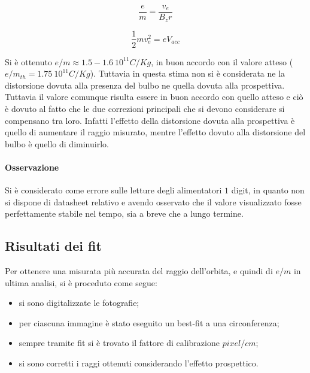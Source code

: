 \documentclass[10pt,a4paper]{article}
\begin{document}
\begin{equation}
	\frac{e}{m} = \frac{v_e}{B_z r}
	\label{eq:em}
\end{equation}

\begin{equation}
\frac{1}{2} m v_e^2 = e V_{acc}
\label{eq:vacc}
\end{equation}

Si è ottenuto  $e/m \approx \unit{1.5-1.6~10^{11}}{C/Kg}$, in buon accordo con il valore atteso ($e/m_{th} = \unit{1.75~10^{11}}{C/Kg}$). Tuttavia in questa stima non si è considerata ne la distorsione dovuta alla presenza del bulbo ne quella dovuta alla prospettiva. Tuttavia il valore comunque risulta essere in buon accordo con quello atteso e ciò è dovuto al fatto che le due correzioni principali che si devono considerare si compensano tra loro. Infatti l'effetto della distorsione dovuta alla prospettiva è quello di aumentare il raggio misurato, mentre l'effetto dovuto alla distorsione del bulbo è quello di diminuirlo.


\paragraph{Osservazione} Si è considerato come errore sulle letture degli alimentatori $1$ digit, in quanto non si dispone di datasheet relativo e avendo osservato che il valore visualizzato fosse perfettamente stabile nel tempo, sia a breve che a lungo termine.

\subsection{Risultati dei fit}

Per ottenere una misurata più accurata del raggio dell'orbita, e quindi di $e/m$ in ultima analisi, si è proceduto come segue:
\begin{itemize}
	\item si sono digitalizzate le fotografie;
	\item per ciascuna immagine è stato eseguito un best-fit a una circonferenza;
	\item sempre tramite fit si è trovato il fattore di calibrazione $pixel/cm$;
	\item si sono corretti i raggi ottenuti considerando l'effetto prospettico.
\end{itemize}
\end{document}
